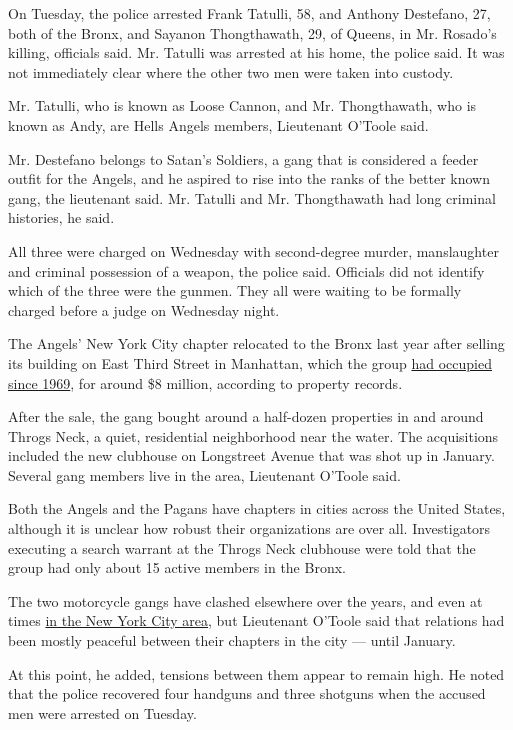 On Tuesday, the police arrested Frank Tatulli, 58, and Anthony
Destefano, 27, both of the Bronx, and Sayanon Thongthawath, 29, of
Queens, in Mr. Rosado's killing, officials said. Mr. Tatulli was
arrested at his home, the police said. It was not immediately clear
where the other two men were taken into custody.

Mr. Tatulli, who is known as Loose Cannon, and Mr. Thongthawath, who is
known as Andy, are Hells Angels members, Lieutenant O'Toole said.

Mr. Destefano belongs to Satan's Soldiers, a gang that is considered a
feeder outfit for the Angels, and he aspired to rise into the ranks of
the better known gang, the lieutenant said. Mr. Tatulli and Mr.
Thongthawath had long criminal histories, he said.

All three were charged on Wednesday with second-degree murder,
manslaughter and criminal possession of a weapon, the police said.
Officials did not identify which of the three were the gunmen. They all
were waiting to be formally charged before a judge on Wednesday night.

The Angels' New York City chapter relocated to the Bronx last year after
selling its building on East Third Street in Manhattan, which the group
\href{https://www.nytimes.com/2007/02/01/nyregion/01angels.html}{had
occupied since 1969}, for around \$8 million, according to property
records.

After the sale, the gang bought around a half-dozen properties in and
around Throgs Neck, a quiet, residential neighborhood near the water.
The acquisitions included the new clubhouse on Longstreet Avenue that
was shot up in January. Several gang members live in the area,
Lieutenant O'Toole said.

Both the Angels and the Pagans have chapters in cities across the United
States, although it is unclear how robust their organizations are over
all. Investigators executing a search warrant at the Throgs Neck
clubhouse were told that the group had only about 15 active members in
the Bronx.

The two motorcycle gangs have clashed elsewhere over the years, and even
at times
\href{https://www.nytimes.com/2002/05/29/nyregion/bikers-take-plea-deal-in-fight-with-hells-angels.html}{in
the New York City area}, but Lieutenant O'Toole said that relations had
been mostly peaceful between their chapters in the city --- until
January.

At this point, he added, tensions between them appear to remain high. He
noted that the police recovered four handguns and three shotguns when
the accused men were arrested on Tuesday.

